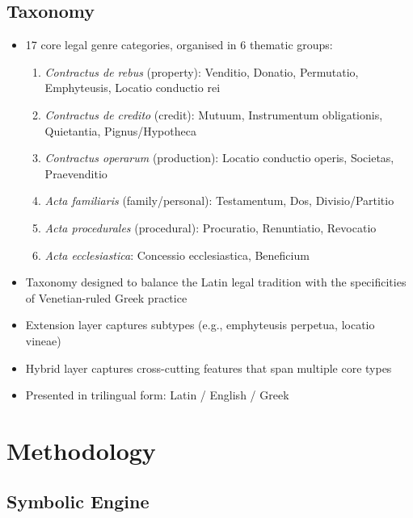 \documentclass[10pt, a4paper]{article}
\begin{document}
\subsection{Taxonomy}

\begin{itemize}
\item 17 core legal genre categories, organised in 6 thematic groups:
  \begin{enumerate}
  \item[I.] \emph{Contractus de rebus} (property): Venditio, Donatio, Permutatio, Emphyteusis, Locatio conductio rei
  \item[II.] \emph{Contractus de credito} (credit): Mutuum, Instrumentum obligationis, Quietantia, Pignus/Hypotheca
  \item[III.] \emph{Contractus operarum} (production): Locatio conductio operis, Societas, Praevenditio
  \item[IV.] \emph{Acta familiaris} (family/personal): Testamentum, Dos, Divisio/Partitio
  \item[V.] \emph{Acta procedurales} (procedural): Procuratio, Renuntiatio, Revocatio
  \item[VI.] \emph{Acta ecclesiastica}: Concessio ecclesiastica, Beneficium
  \end{enumerate}
\item Taxonomy designed to balance the Latin legal tradition with the specificities of Venetian-ruled Greek practice
\item Extension layer captures subtypes (e.g., emphyteusis perpetua, locatio vineae)
\item Hybrid layer captures cross-cutting features that span multiple core types
\item Presented in trilingual form: Latin / English / Greek
\end{itemize}


\section{Methodology}

\subsection{Symbolic Engine}
\end{document}
